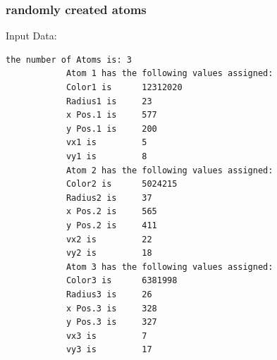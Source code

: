 \documentclass[11pt,titlepage]{article}
\begin{document}
			\subsubsection{randomly created atoms}
			Input Data:
			\begin{lstlisting}[numbers=none]
			the number of Atoms is: 3
			Atom 1 has the following values assigned:
			Color1 is      12312020
			Radius1 is     23
			x Pos.1 is     577
			y Pos.1 is     200
			vx1 is         5
			vy1 is         8
			Atom 2 has the following values assigned:
			Color2 is      5024215
			Radius2 is     37
			x Pos.2 is     565
			y Pos.2 is     411
			vx2 is         22
			vy2 is         18
			Atom 3 has the following values assigned:
			Color3 is      6381998
			Radius3 is     26
			x Pos.3 is     328
			y Pos.3 is     327
			vx3 is         7
			vy3 is         17
			\end{lstlisting}
\end{document}
